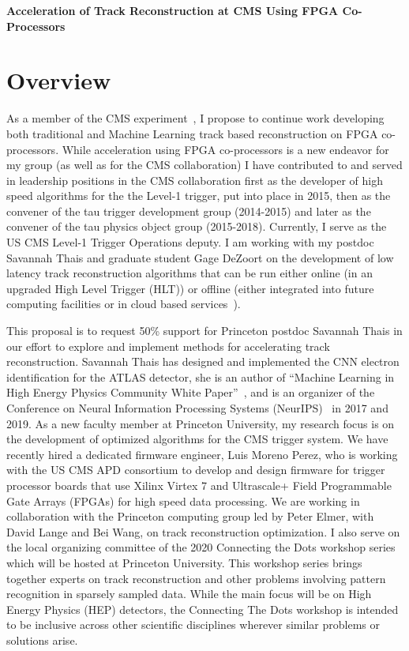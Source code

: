 \documentclass[preprint,12pt]{elsarticle}
\begin{document}





\noindent
\textbf{Acceleration of Track Reconstruction at CMS Using FPGA Co-Processors}

\section{Overview}
\label{S:1}
As a member of the CMS experiment~\cite{CMS-JINST}, I propose to continue work developing both
traditional and Machine Learning track based reconstruction on FPGA co-processors.
While acceleration using FPGA co-processors is a new endeavor for my group 
(as well as for the CMS collaboration) I have contributed to and served 
in leadership positions in the CMS collaboration first as the developer of
high speed algorithms for the the Level-1 trigger, put into place in 2015,
then as the convener of the tau trigger development group (2014-2015) 
and later as the convener of the tau physics object group (2015-2018).
Currently, I serve as the US CMS Level-1 Trigger Operations deputy.
I am working with my postdoc Savannah Thais and graduate student Gage DeZoort
on the development of low latency track reconstruction algorithms
that can be run either online (in an upgraded High Level Trigger (HLT)) or offline
(either integrated into future computing facilities or in cloud based services~\cite{Duarte_2019}). 

This proposal is to request 50\% support for Princeton postdoc Savannah Thais
in our effort to explore and implement methods for accelerating track reconstruction.
Savannah Thais has designed and implemented the CNN electron identification
for the ATLAS detector, she is an author of 
``Machine Learning in High Energy Physics Community White Paper''~\cite{albertsson2018machine},
and is an organizer of the Conference on Neural Information Processing Systems (NeurIPS)~\cite{Neurips} in 2017 and 2019.
As a new faculty member at Princeton University, my research focus is 
on the development of optimized algorithms for the CMS trigger system.
We have recently hired a dedicated firmware engineer, Luis Moreno Perez,
who is working with the US CMS APD consortium to develop and design firmware
for trigger processor boards that use Xilinx Virtex 7 and Ultrascale+ 
Field Programmable Gate Arrays (FPGAs) for high speed data processing.
We are working in collaboration with the Princeton computing group led by Peter Elmer,
with David Lange and Bei Wang, on track reconstruction optimization. 
I also serve on the local organizing committee of the 2020 Connecting the Dots 
workshop series which will be hosted at Princeton University. This workshop
series brings together 
experts on track reconstruction and other problems involving pattern recognition 
in sparsely sampled data. While the main focus will be on High Energy Physics (HEP) 
detectors, the Connecting The Dots workshop is intended to be inclusive across other
scientific disciplines wherever similar problems or solutions arise. 
\end{document}
